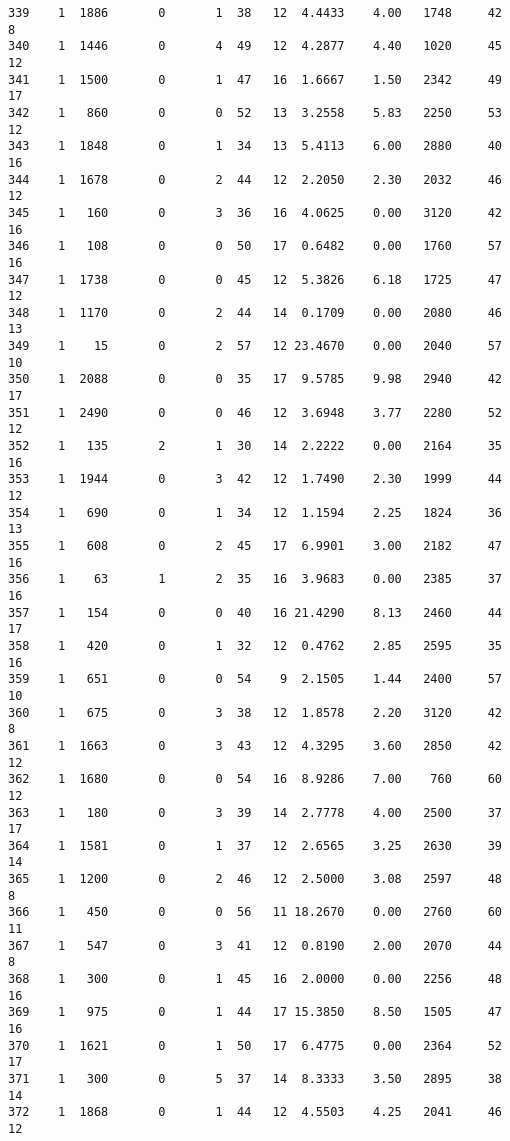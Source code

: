 \documentclass[
  letterpaper,
  DIV=11,
  numbers=noendperiod]{scrreprt}
\begin{document}
\begin{verbatim}
339    1  1886       0       1  38   12  4.4433    4.00   1748     42       8
340    1  1446       0       4  49   12  4.2877    4.40   1020     45      12
341    1  1500       0       1  47   16  1.6667    1.50   2342     49      17
342    1   860       0       0  52   13  3.2558    5.83   2250     53      12
343    1  1848       0       1  34   13  5.4113    6.00   2880     40      16
344    1  1678       0       2  44   12  2.2050    2.30   2032     46      12
345    1   160       0       3  36   16  4.0625    0.00   3120     42      16
346    1   108       0       0  50   17  0.6482    0.00   1760     57      16
347    1  1738       0       0  45   12  5.3826    6.18   1725     47      12
348    1  1170       0       2  44   14  0.1709    0.00   2080     46      13
349    1    15       0       2  57   12 23.4670    0.00   2040     57      10
350    1  2088       0       0  35   17  9.5785    9.98   2940     42      17
351    1  2490       0       0  46   12  3.6948    3.77   2280     52      12
352    1   135       2       1  30   14  2.2222    0.00   2164     35      16
353    1  1944       0       3  42   12  1.7490    2.30   1999     44      12
354    1   690       0       1  34   12  1.1594    2.25   1824     36      13
355    1   608       0       2  45   17  6.9901    3.00   2182     47      16
356    1    63       1       2  35   16  3.9683    0.00   2385     37      16
357    1   154       0       0  40   16 21.4290    8.13   2460     44      17
358    1   420       0       1  32   12  0.4762    2.85   2595     35      16
359    1   651       0       0  54    9  2.1505    1.44   2400     57      10
360    1   675       0       3  38   12  1.8578    2.20   3120     42       8
361    1  1663       0       3  43   12  4.3295    3.60   2850     42      12
362    1  1680       0       0  54   16  8.9286    7.00    760     60      12
363    1   180       0       3  39   14  2.7778    4.00   2500     37      17
364    1  1581       0       1  37   12  2.6565    3.25   2630     39      14
365    1  1200       0       2  46   12  2.5000    3.08   2597     48       8
366    1   450       0       0  56   11 18.2670    0.00   2760     60      11
367    1   547       0       3  41   12  0.8190    2.00   2070     44       8
368    1   300       0       1  45   16  2.0000    0.00   2256     48      16
369    1   975       0       1  44   17 15.3850    8.50   1505     47      16
370    1  1621       0       1  50   17  6.4775    0.00   2364     52      17
371    1   300       0       5  37   14  8.3333    3.50   2895     38      14
372    1  1868       0       1  44   12  4.5503    4.25   2041     46      12

\end{verbatim}
\end{document}

